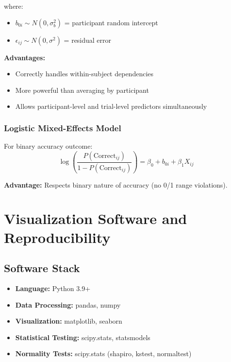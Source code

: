 \documentclass[12pt,a4paper]{article}
\begin{document}
where:
\begin{itemize}
    \item $b_{0i} \sim N(0, \sigma^2_b)$ = participant random intercept
    \item $\epsilon_{ij} \sim N(0, \sigma^2)$ = residual error
\end{itemize}

\textbf{Advantages:}
\begin{itemize}
    \item Correctly handles within-subject dependencies
    \item More powerful than averaging by participant
    \item Allows participant-level and trial-level predictors simultaneously
\end{itemize}

\subsubsection{Logistic Mixed-Effects Model}

For binary accuracy outcome:
\begin{equation}
\log\left(\frac{P(\text{Correct}_{ij})}{1 - P(\text{Correct}_{ij})}\right) = \beta_0 + b_{0i} + \beta_1 X_{ij}
\end{equation}

\textbf{Advantage:} Respects binary nature of accuracy (no 0/1 range violations).

\newpage
\section{Visualization Software and Reproducibility}

\subsection{Software Stack}

\begin{itemize}
    \item \textbf{Language:} Python 3.9+
    \item \textbf{Data Processing:} pandas, numpy
    \item \textbf{Visualization:} matplotlib, seaborn
    \item \textbf{Statistical Testing:} scipy.stats, statsmodels
    \item \textbf{Normality Tests:} scipy.stats (shapiro, kstest, normaltest)
\end{itemize}
\end{document}
